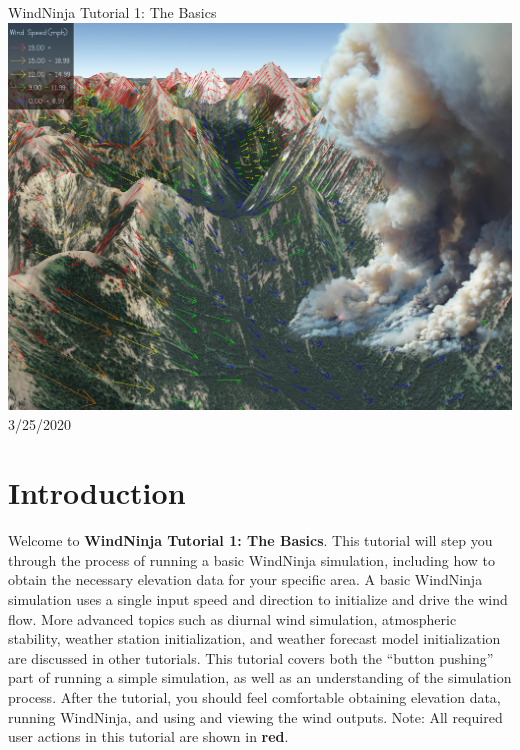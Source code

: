 \documentclass[12pt]{article}
\begin{document}
\begin{titlepage}
    \centering
    {\Huge
        WindNinja Tutorial 1:
        The Basics
    }    
    \vfill
    \includegraphics[scale=0.35]							{title_fig.jpg}
    \vfill
  	{\Huge
	  3/25/2020 %
  	}
    \vfill
\end{titlepage}

\section*{Introduction}
\noindent
Welcome to \textbf{WindNinja Tutorial 1: The Basics}.  This tutorial will step you through the process of running a basic WindNinja simulation, including how to obtain the necessary elevation data for your specific area.  A basic WindNinja simulation uses a single input speed and direction to initialize and drive the wind flow.  More advanced topics such as diurnal wind simulation, atmospheric stability, weather station initialization, and weather forecast model initialization are discussed in other tutorials.  This tutorial covers both the “button pushing” part of running a simple simulation, as well as an understanding of the simulation process.  After the tutorial, you should feel comfortable obtaining elevation data, running WindNinja, and using and viewing the wind outputs.
\newline\break
Note:  All required user actions in this tutorial are shown in     \textbf{\color{red} red}.
\end{document}
